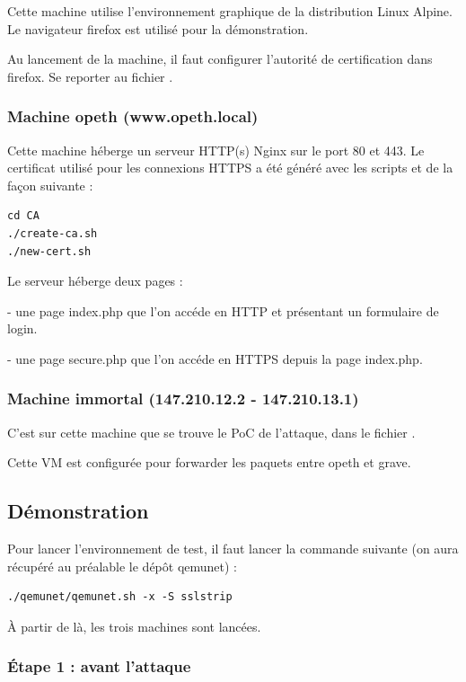 Cette machine utilise l'environnement graphique de la distribution Linux Alpine. Le navigateur firefox est utilisé pour la démonstration.

Au lancement de la machine, il faut configurer l'autorité de certification dans firefox. Se reporter au fichier .

\subsubsection{Machine opeth (www.opeth.local)}

Cette machine héberge un serveur HTTP(s) Nginx sur le port 80 et 443. Le certificat utilisé pour les connexions HTTPS a été généré avec les scripts  et  de la façon suivante :

\begin{verbatim}
cd CA
./create-ca.sh
./new-cert.sh
\end{verbatim}

Le serveur héberge deux pages :

  - une page index.php que l'on accéde en HTTP et présentant un formulaire de login.

  - une page secure.php que l'on accéde en HTTPS depuis la page index.php.

\subsubsection{Machine immortal (147.210.12.2 - 147.210.13.1)}

C'est sur cette machine que se trouve le PoC de l'attaque, dans le fichier .

Cette VM est configurée pour forwarder les paquets entre opeth et grave.

\subsection{Démonstration}

Pour lancer l'environnement de test, il faut lancer la commande suivante (on aura récupéré au préalable le dépôt qemunet) :

\begin{verbatim}
./qemunet/qemunet.sh -x -S sslstrip
\end{verbatim}

À partir de là, les trois machines sont lancées.

\subsubsection{Étape 1 : avant l'attaque}

